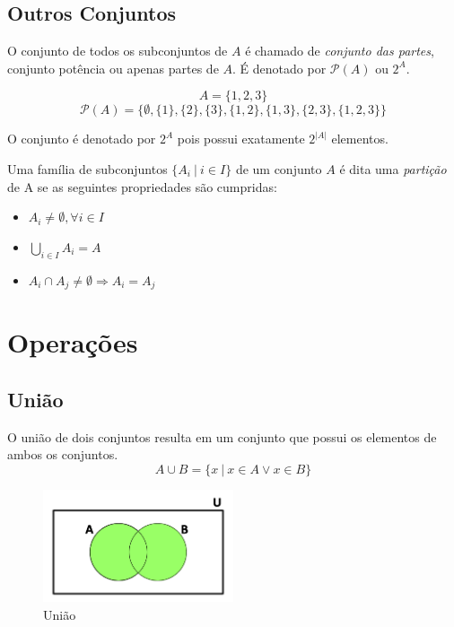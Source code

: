 \subsection*{Outros Conjuntos}
\begin{df}
O conjunto de todos os subconjuntos de $A$ é chamado de \emph{conjunto das partes}, conjunto potência ou apenas partes de $A$. É denotado por $\mathcal{P}(A)$ ou $2^A$. \begin{exemplo}
\[A=\{1, 2, 3\}\]
\[\mathcal{P}(A)=\{\emptyset, \{1\}, \{2\}, \{3\}, \{1,2\}, \{1,3\}, \{2,3\}, \{1,2,3\}\}\]
\end{exemplo}
O conjunto é denotado por $2^{A}$ pois possui exatamente $2^{|A|}$ elementos.
\end{df}
\begin{df}
Uma família de subconjuntos $\{A_i \: | \: i \in I\}$ de um conjunto $A$ é dita uma \emph{partição} de A se as seguintes propriedades são cumpridas:
\begin{itemize}
	\item $A_i \neq \emptyset, \forall i \in I$
	\item $\bigcup\limits_{i \in I} A_i = A$
	\item $A_i \cap A_j \neq \emptyset \Rightarrow A_i =A_j$
\end{itemize}
\end{df}

\section{Operações}
\subsection*{União}
O união de dois conjuntos resulta em um conjunto que possui os elementos de ambos os conjuntos.
\[A \cup B = \{x \: | \: x\in A \vee x \in B\}\]
\begin{figure}[H]
  \caption{União}
  \centering
  \includegraphics[width=0.5\textwidth]{algebra/imagens/uni}
\end{figure}

